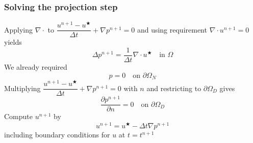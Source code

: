 \begin{frame}
  \frametitle{Solving the projection step}
  Applying $\nabla \cdot$ to 
  $
    \dfrac{u^{n+1} - u^{\bigstar}}{\Delta t} + \nabla p^{n+1} = 0
  $
  and using requirement $\nabla \cdot u^{n+1} = 0$ yields
  \begin{equation*}
    \Delta p^{n+1} = \dfrac{1}{\Delta t} \nabla  \cdot u^{\bigstar} \quad \text{in }
    \Omega
  \end{equation*}
  We already required
  \begin{equation*}
    p = 0 \quad \text{on } \partial \Omega_N
  \end{equation*}
  Multiplying 
  $
    \dfrac{u^{n+1} - u^{\bigstar}}{\Delta t} + \nabla p^{n+1} = 0
  $
  with $n$ and restricting to $\partial \Omega_D$ gives
  \begin{equation*}
    \dfrac{\partial p^{n+1}}{\partial n} = 0 \quad \text{on }
    \partial \Omega_D
  \end{equation*}
  Compute $u^{n+1}$ by
  \begin{equation*}
    u^{n+1} = u^{\bigstar} - \Delta t \nabla p^{n+1}
  \end{equation*}
  including boundary conditions for $u$ at $t = t^{n+1}$
\end{frame}

